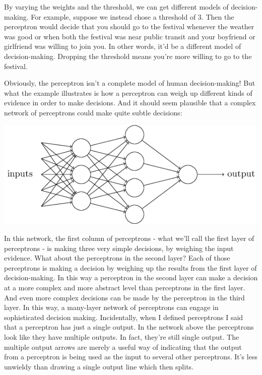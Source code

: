 \documentclass[a4paper,12pt]{report}%
\begin{document}
By varying the weights and the threshold, we can get different models of decision-making. For example, suppose we instead chose a threshold of $3$. Then the perceptron would decide that you should go to the festival whenever the weather was good or when both the festival was near public transit and your boyfriend or girlfriend was willing to join you. In other words, it'd be a different model of decision-making. Dropping the threshold means you're more willing to go to the festival.

Obviously, the perceptron isn't a complete model of human decision-making! But what the example illustrates is how a perceptron can weigh up different kinds of evidence in order to make decisions. And it should seem plausible that a complex network of perceptrons could make quite subtle decisions:

\begin{center}
 \includegraphics[width=0.9\linewidth]{images/tikz1.png}
\end{center}

In this network, the first column of perceptrons - what we'll call the first layer of perceptrons - is making three very simple decisions, by weighing the input evidence. What about the perceptrons in the second layer? Each of those perceptrons is making a decision by weighing up the results from the first layer of decision-making. In this way a perceptron in the second layer can make a decision at a more complex and more abstract level than perceptrons in the first layer. And even more complex decisions can be made by the perceptron in the third layer. In this way, a many-layer network of perceptrons can engage in sophisticated decision making.
Incidentally, when I defined perceptrons I said that a perceptron has just a single output. In the network above the perceptrons look like they have multiple outputs. In fact, they're still single output. The multiple output arrows are merely a useful way of indicating that the output from a perceptron is being used as the input to several other perceptrons. It's less unwieldy than drawing a single output line which then splits.
\end{document}

